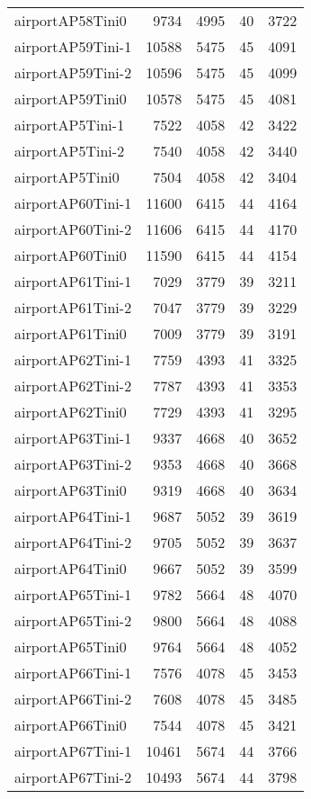 \begin{longtable}{lrrrr}
airportAP58Tini0 & 9734 & 4995 & 40 & 3722 \\
airportAP59Tini-1 & 10588 & 5475 & 45 & 4091 \\
airportAP59Tini-2 & 10596 & 5475 & 45 & 4099 \\
airportAP59Tini0 & 10578 & 5475 & 45 & 4081 \\
airportAP5Tini-1 & 7522 & 4058 & 42 & 3422 \\
airportAP5Tini-2 & 7540 & 4058 & 42 & 3440 \\
airportAP5Tini0 & 7504 & 4058 & 42 & 3404 \\
airportAP60Tini-1 & 11600 & 6415 & 44 & 4164 \\
airportAP60Tini-2 & 11606 & 6415 & 44 & 4170 \\
airportAP60Tini0 & 11590 & 6415 & 44 & 4154 \\
airportAP61Tini-1 & 7029 & 3779 & 39 & 3211 \\
airportAP61Tini-2 & 7047 & 3779 & 39 & 3229 \\
airportAP61Tini0 & 7009 & 3779 & 39 & 3191 \\
airportAP62Tini-1 & 7759 & 4393 & 41 & 3325 \\
airportAP62Tini-2 & 7787 & 4393 & 41 & 3353 \\
airportAP62Tini0 & 7729 & 4393 & 41 & 3295 \\
airportAP63Tini-1 & 9337 & 4668 & 40 & 3652 \\
airportAP63Tini-2 & 9353 & 4668 & 40 & 3668 \\
airportAP63Tini0 & 9319 & 4668 & 40 & 3634 \\
airportAP64Tini-1 & 9687 & 5052 & 39 & 3619 \\
airportAP64Tini-2 & 9705 & 5052 & 39 & 3637 \\
airportAP64Tini0 & 9667 & 5052 & 39 & 3599 \\
airportAP65Tini-1 & 9782 & 5664 & 48 & 4070 \\
airportAP65Tini-2 & 9800 & 5664 & 48 & 4088 \\
airportAP65Tini0 & 9764 & 5664 & 48 & 4052 \\
airportAP66Tini-1 & 7576 & 4078 & 45 & 3453 \\
airportAP66Tini-2 & 7608 & 4078 & 45 & 3485 \\
airportAP66Tini0 & 7544 & 4078 & 45 & 3421 \\
airportAP67Tini-1 & 10461 & 5674 & 44 & 3766 \\
airportAP67Tini-2 & 10493 & 5674 & 44 & 3798 \\

\end{longtable}
